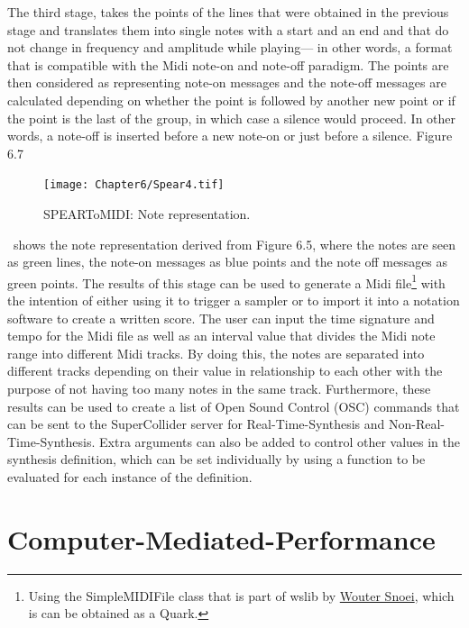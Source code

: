 The third stage, takes the points of the lines that were obtained in the previous stage and translates them into single notes with a start and an end and that do not change in frequency and amplitude while playing--- in other words, a format that is compatible with the Midi note-on and note-off paradigm. The points are then considered as representing note-on messages and the note-off messages are calculated depending on whether the point is followed by another new point or if the point is the last of the group, in which case a silence would proceed. In other words, a note-off is inserted before a new note-on or just before a silence. Figure 6.7 
\begin{figure}[htbp] %
   \centering
   \texttt{[image: Chapter6/Spear4.tif]} %
   \caption{SPEARToMIDI: Note representation.}
   \label{fig:example}
\end{figure}\
shows the note representation derived from Figure 6.5, where the notes are seen as green lines, the note-on messages as blue points and the note off messages as green points. 
The results of this stage can be used to generate a Midi file\hypertarget{wlib}{}\footnote{Using the SimpleMIDIFile class that is part of wslib by \href{http://www.woutersnoei.nl/}{Wouter Snoei}, which is can be obtained as a Quark.} with the intention of either using it to trigger a sampler or to import it into a notation software to create a written score. The user can input the time signature and tempo for the Midi file as well as an interval value that divides the Midi note range into different Midi tracks. By doing this, the notes are separated into different tracks depending on their value in relationship to each other with the purpose of not having too many notes in the same track. Furthermore, these results can be used to create a list of Open Sound Control (OSC) commands that can be sent to the SuperCollider server for Real-Time-Synthesis and Non-Real-Time-Synthesis. Extra arguments can also be added to control other values in the synthesis definition, which can be set individually by using a function to be evaluated for each instance of the definition.

\section{Computer-Mediated-Performance}

